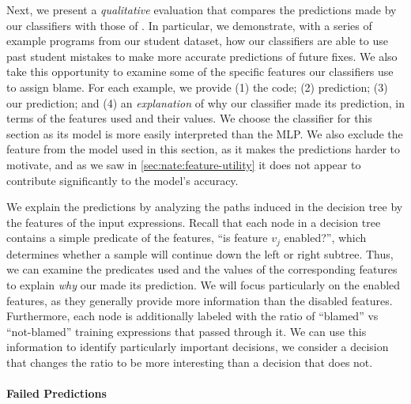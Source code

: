 \label{sec:nate:qualitative}

Next, we present a \emph{qualitative} evaluation
that compares the predictions made by our classifiers
with those of \sherrloc.
%
In particular, we demonstrate, with a series of example programs from
our student dataset, how our classifiers are able to use past student
mistakes to make more accurate predictions of future fixes.
%
We also take this opportunity to examine some of the specific features
our classifiers use to assign blame.
%
For each example, we provide
%
(1) the code;
%
(2)  prediction;
%
(3) our  prediction; and
%
(4) an \emph{explanation} of why our classifier made its prediction, in
terms of the features used and their values.
%
We choose the \dectree classifier for this section as its model is more
easily interpreted than the MLP.\@
%
We also exclude the \ExprSize feature from the model used in this
section, as it makes the predictions harder to motivate, and as we saw
in \autoref{sec:nate:feature-utility} it does not appear to contribute
significantly to the model's accuracy.

We explain the predictions by analyzing the paths induced in
the decision tree by the features of the input expressions.
%
Recall that each node in a decision tree contains a simple predicate of
the features, \eg ``is feature $v_j$ enabled?'', which determines
whether a sample will continue down the left or right subtree.
%
Thus, we can examine the predicates used and the values of the
corresponding features to explain \emph{why} our \dectree made its
prediction.
%
We will focus particularly on the enabled features, as they generally
provide more information than the disabled features.
%
Furthermore, each node is additionally labeled with the ratio of
``blamed'' vs ``not-blamed'' training expressions that passed through
it.
%
We can use this information to identify particularly important
decisions, \ie we consider a decision that changes the ratio to be more
interesting than a decision that does not.

%

\paragraph{Failed Predictions}
\label{sec:nate:failed-predictions}

